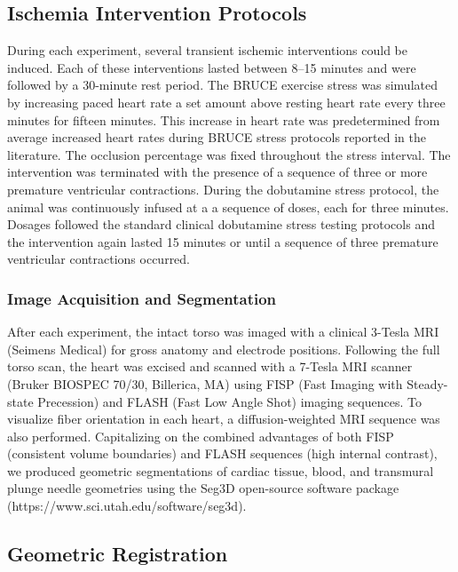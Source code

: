 \documentclass[twocolumn]{cinc}
\begin{document}
\subsection{Ischemia Intervention Protocols}

During each experiment, several transient ischemic interventions
could be induced. Each of these interventions lasted between 8--15
minutes and were followed by a 30-minute rest period. The BRUCE exercise
stress was simulated by increasing paced heart rate a set amount above
resting heart rate every three minutes for fifteen minutes. This increase
in heart rate was predetermined from average increased heart rates
during BRUCE stress protocols reported in the
literature. \cite{Okin1986a} The occlusion percentage was fixed throughout
the stress interval. The intervention was terminated with the
presence of a sequence of three or more premature ventricular
contractions. During the dobutamine stress protocol, the
animal was continuously infused at a a sequence of doses,
each for three minutes. Dosages followed the standard clinical
dobutamine stress testing protocols \cite{Secknus1997} and the
intervention again lasted 15 minutes or until a sequence of three
premature ventricular contractions occurred.

\subsubsection{Image Acquisition and Segmentation}

After each experiment, the intact torso was imaged with a clinical
3-Tesla MRI (Seimens Medical) for gross anatomy and electrode
positions. Following the full torso scan, the heart was excised and scanned
with a 7-Tesla MRI scanner (Bruker BIOSPEC 70/30, Billerica, MA) using FISP
(Fast Imaging with Steady-state Precession) and FLASH (Fast Low Angle Shot)
imaging sequences. To visualize fiber orientation in each heart, a
diffusion-weighted MRI sequence was also performed. Capitalizing on the combined advantages of both FISP (consistent
volume boundaries) and FLASH sequences (high internal contrast), we
produced geometric segmentations of cardiac tissue,
blood, and transmural plunge needle geometries using the Seg3D open-source
software package (https://www.sci.utah.edu/software/seg3d).

\subsection{Geometric Registration}
\end{document}
